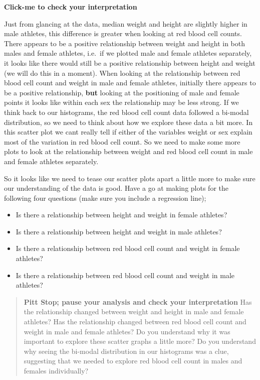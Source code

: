 \documentclass[
]{book}
\providecommand{\tightlist}{%
  \setlength{\itemsep}{0pt}\setlength{\parskip}{0pt}}
\begin{document}
\textbf{Click-me to check your interpretation}

Just from glancing at the data, median weight and height are slightly higher in male athletes, this difference is greater when looking at red blood cell counts. There appears to be a positive relationship between weight and height in both males and female athletes, i.e.~if we plotted male and female athletes separately, it looks like there would still be a positive relationship between height and weight (we will do this in a moment). When looking at the relationship between red blood cell count and weight in male and female athletes, initially there appears to be a positive relationship, \textbf{but} looking at the positioning of male and female points it looks like within each sex the relationship may be less strong. If we think back to our histograms, the red blood cell count data followed a bi-modal distribution, so we need to think about how we explore these data a bit more. In this scatter plot we cant really tell if either of the variables weight or sex explain most of the variation in red blood cell count. So we need to make some more plots to look at the relationship between weight and red blood cell count in male and female athletes separately.

So it looks like we need to tease our scatter plots apart a little more to make sure our understanding of the data is good. Have a go at making plots for the following four questions (make sure you include a regression line);

\begin{itemize}
\tightlist
\item
  Is there a relationship between height and weight in female athletes?
\item
  Is there a relationship between height and weight in male athletes?
\item
  Is there a relationship between red blood cell count and weight in female athletes?
\item
  Is there a relationship between red blood cell count and weight in male athletes?
\end{itemize}

\begin{quote}
\textbf{Pitt Stop; pause your analysis and check your interpretation}
Has the relationship changed between weight and height in male and female athletes? Has the relationship changed between red blood cell count and weight in male and female athletes? Do you understand why it was important to explore these scatter graphs a little more? Do you understand why seeing the bi-modal distribution in our histograms was a clue, suggesting that we needed to explore red blood cell count in males and females individually?
\end{quote}
\end{document}
